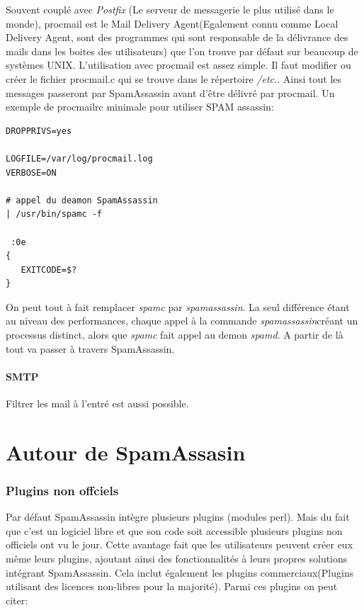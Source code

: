 \documentclass[a4paper,11pt]{article}
\begin{document}
Souvent couplé avec \emph{Postfix} (Le serveur de messagerie le plus utilisé dans le monde), procmail est le 
Mail Delivery Agent(Egalement connu comme Local Delivery Agent, sont des programmes qui sont responsable
de la délivrance des mails dans les boites des utilisateurs) que l'on trouve par défaut sur beaucoup de systèmes UNIX.
L'utilisation avec procmail est assez simple. Il faut modifier ou créer le fichier procmail.c qui se trouve dans le répertoire \emph{/etc.}.
Ainsi tout les messages passeront par SpamAssassin avant d'être délivré par procmail. 
\linebreak
Un exemple de procmailrc minimale pour utiliser SPAM assassin:
\begin{lstlisting}[frame=single]  
DROPPRIVS=yes

LOGFILE=/var/log/procmail.log
VERBOSE=ON

# appel du deamon SpamAssassin
| /usr/bin/spamc -f

 :0e
{
   EXITCODE=$?
}
\end{lstlisting}
On peut tout à fait remplacer \emph{spamc} par \emph{spamassassin}. La seul différence étant au niveau des performances, 
chaque appel à la commande \emph{spamassassin}créant un processus distinct, alors que \emph{spamc} fait appel au demon \emph{spamd}.
A partir de là tout va passer à travers SpamAssassin.

\pagebreak

\subsection{SMTP}

Filtrer les mail à l'entré est aussi possible. 
        

\part{Autour de SpamAssasin}

\section{Plugins non offciels}

Par défaut SpamAssassin intègre plusieurs plugins (modules perl). Mais du fait que c'est un logiciel libre et que son code soit accessible plusieurs
plugins non officiels ont vu le jour. Cette avantage fait que les utilisateurs peuvent créer eux même leurs plugins,
ajoutant ainsi des fonctionnalités à leurs propres solutions intégrant SpamAssassin. Cela inclut également les plugins commerciaux(Plugins utilisant des licences non-libres pour la majorité). 
Parmi ces plugins on peut citer:
\end{document}
